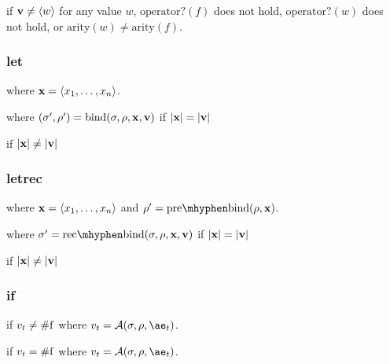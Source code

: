 \documentclass{sigplanconf}
\begin{document}
\noindent
{}

\noindent
if $\mathbf{v}\ne\langle w\rangle$ for any value $w$, $\mathrm{operator?}(f)$ does not hold, $\mathrm{operator?}(w)$ does not hold, or $\mathrm{arity}(w)\ne\mathrm{arity}(f)$.

\subsubsection{let}

\noindent
{}

\noindent
where $\mathbf{x}=\langle x_1,\dots,x_n\rangle$.


\noindent
where $(\sigma',\rho')=\mathrm{bind}(\sigma,\rho,\mathbf{x},\mathbf{v})$ if $|\mathbf{x}|=|\mathbf{v}|$

 if $|\mathbf{x}|\ne|\mathbf{v}|$

\subsubsection{letrec}

\noindent
{}

\noindent
where $\mathbf{x}=\langle x_1,\dots,x_n\rangle$ and $\rho'=\prebind{\rho}{\vx}$.


\noindent
where $\sigma'=\recbind{\sigma}{\rho}{\vx}{\vv}$ if $|\mathbf{x}|=|\mathbf{v}|$

 if $|\mathbf{x}|\ne|\mathbf{v}|$

\subsubsection{if}

if $v_t\ne\mathrm{\#f}$
where $v_t=\A{\sigma}{\rho}{\ae_t}$.

if $v_t=\mathrm{\#f}$
where $v_t=\A{\sigma}{\rho}{\ae_t}$.
\end{document}
